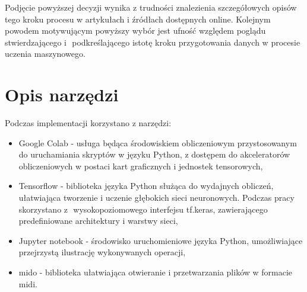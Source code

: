 {{    Podjęcie powyższej decyzji wynika z\,\,trudności znalezienia szczegółowych opisów tego kroku 
    procesu w artykułach i\,\,źródłach dostępnych online. 
    Kolejnym powodem motywującym powyższy wybór jest ufność względem poglądu stwierdzającego i\,\,
    podkreślającego istotę kroku przygotowania danych w procesie uczenia maszynowego.

  }

  \section{Opis narzędzi}
  {
    Podczas implementacji korzystano z\,\,narzędzi:
    \begin{itemize}
      \setlength\itemsep{-0.5em}
      \item Google Colab - usługa będąca środowiskiem obliczeniowym przystosowanym 
      do uruchamiania skryptów w\,\,języku Python, z\,\,dostępem do akceleratorów obliczeniowych
      w\,\,postaci kart graficznych i\,\,jednostek tensorowych,
      \item Tensorflow - biblioteka języka Python służąca do wydajnych obliczeń, ułatwiająca 
      tworzenie i\,\,uczenie głębokich sieci neuronowych. Podczas pracy skorzystano z\,\,
      wysokopoziomowego interfejsu tf.keras, zawierającego predefiniowane architektury i\,\,warstwy sieci,
      \item Jupyter notebook - środowisko uruchomieniowe języka Python, umożliwiające przejrzystą
      ilustrację wykonywanych operacji,
      \item mido - biblioteka ułatwiająca otwieranie i\,\,przetwarzania plików w\,\,formacie midi.
    \end{itemize}
  }
}